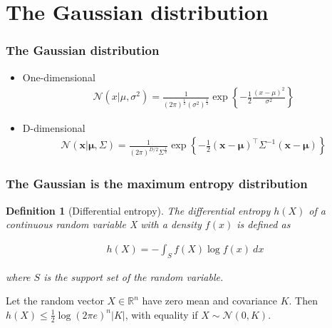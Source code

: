 \documentclass[11pt]{beamer}
\newtheorem{probDef}{Definition}
\begin{document}
\section{The Gaussian distribution}

\begin{frame}
\frametitle{The Gaussian distribution}

    \begin{itemize}
        \item One-dimensional
        \begin{align*}
            \mathcal{N}(x|\mu,\sigma^2)=\frac{1}{(2\pi)^\frac{1}{2}(\sigma^2)^\frac{1}{2}}\exp\left\{-\frac{1}{2}\frac{(x-\mu)^2}{\sigma^2}\right\}
        \end{align*}
        \item D-dimensional
        \begin{align*}
            \mathcal{N}(\mathbf{x}|\boldsymbol{\mu},\Sigma)=\frac{1}{(2\pi)^{D/2}\Sigma^{\frac{1}{2}}}\exp\left\{-\frac{1}{2}(\mathbf{x}-\boldsymbol{\mu})^\intercal\Sigma^{-1}(\mathbf{x}-\boldsymbol{\mu})\right\}
        \end{align*}
    \end{itemize}

\end{frame}

\begin{frame}
    \frametitle{The Gaussian is the maximum entropy distribution
    \citep{coverAndThomas91}}

    \begin{probDef}[Differential entropy]
        The \textit{differential entropy} $h(X)$ of a continuous random
        variable X with a density $f(x)$ is defined as

        \begin{align*}
            h(X)=-\int_Sf(X)\log f(x)\ dx
        \end{align*}

        where $S$ is the support set of the random variable.
    \end{probDef}

    \begin{theorem}
        Let the random vector $X\in\mathbb{R}^n$ have zero mean and covariance
        $K$. Then $h(X)\le\frac{1}{2}\log(2\pi e)^n|K|$, with equality if
        $X\sim\mathcal{N}(0,K)$.
    \end{theorem}

\end{frame}
\end{document}
